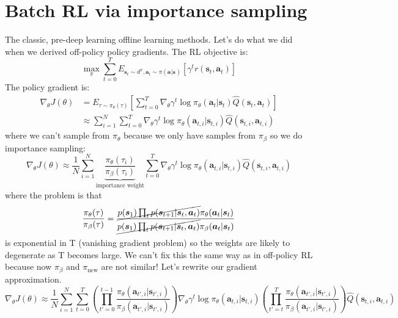\documentclass{report}
\begin{document}
\section{Batch RL via importance sampling}
The classic, pre-deep learning offline learning methods.
Let's do what we did when we derived off-policy policy gradients.
The RL objective is:
\begin{equation}
		\max_{\pi} \sum_{t=0}^{T} E_{\bm{s}_{t}\sim d^{\pi}, \bm{a}_{t}\sim \pi (\bm{a}_{}|\bm{s}_{})}
		\left[ \gamma^{t} r (\bm{s}_{t}, \bm{a}_{t} ) \right] 
\end{equation}
The policy gradient is:
\begin{align}
		\nabla_{\theta} J(\theta) &= E_{\tau \sim \pi_{\theta}(\tau)}
\left[ \sum_{t=0}^{T} \nabla_{\theta} \gamma^{t} \log \pi_{\theta} (\bm{a}_{t}| \bm{s}_{t} ) \hat{Q} (\bm{s}_{t}, \bm{a}_{t} ) \right]  \\
  &\approx \sum_{i=1}^{N} \sum_{t=0}^{T} \nabla_{\theta} \gamma^{t} \log \pi_{\theta} (\bm{a}_{t,i}| \bm{s}_{t,i} )
  \hat{Q} (\bm{s}_{t,i}, \bm{a}_{t,i} )
\end{align}
where we can't sample from $ \pi_{\theta}  $ because we only
have samples from $ \pi_{\beta}  $ so we do importance sampling:
\begin{equation}
\nabla_{\theta} J(\theta) \approx 
\frac{1}{N} \sum_{i=1}^{N} 
\underbrace{\frac{\pi_{\theta}(\tau_i)}{\pi_\beta(\tau_i)} }_{\text{importance weight}}
\sum_{t=0}^{T} 
\nabla_{\theta} \gamma^t \log \pi_\theta (\bm{a}_{t,i}| \bm{s}_{t,i} ) \hat{Q} (\bm{s}_{t,i}, \bm{a}_{t,i} )
\end{equation}
where the problem is that
\begin{equation}
		\frac{\pi_\theta(\tau)}{\pi_\beta(\tau)} =
		\frac{\cancel{p(\bm{s}_{1}) \prod_{t}^{} p(\bm{s}_{t+1}| \bm{s}_{t}, \bm{a}_{t})} \pi_\theta (\bm{a}_{t}| \bm{s}_{t} ) }
		{\cancel{p(\bm{s}_{1}) \prod_{t}^{} p(\bm{s}_{t+1}| \bm{s}_{t}, \bm{a}_{t})} \pi_\beta (\bm{a}_{t}| \bm{s}_{t} ) } 	
\end{equation}
is exponential in T (vanishing gradient problem)
so the weights are likely to degenerate as T becomes large.
We can't fix this the same way as in off-policy RL because now $\pi_{ \beta }$ and $\pi_{ \text{new} }$ are not similar!
Let's rewrite our gradient approximation.
\begin{equation}
\nabla_{ \theta } J (\theta) \approx \frac{1}{N} \sum_{i=1}^{N} \sum_{t=0}^{T} 
\left( \prod_{t'=0}^{t-1} \frac{\pi_{ \theta } (\bm{a}_{t',i}|\bm{s}_{t',i})}{\pi_{ \beta } (\bm{a}_{t',i}|\bm{s}_{t',i})}   \right) 
\nabla_{ \theta } \gamma^{ t }  \log \pi_{ \theta } (\bm{a}_{t,i}| \bm{s}_{t,i} )
\left( \prod_{t'=t}^{T} \frac{\pi_{ \theta } (\bm{a}_{t',i}| \bm{s}_{t',i} )}{\pi_{ \beta }(\bm{a}_{t',i}| \bm{s}_{t',i} )}   \right)
\hat{Q} (\bm{s}_{t,i}, \bm{a}_{t,i} )
\end{equation}
\end{document}
